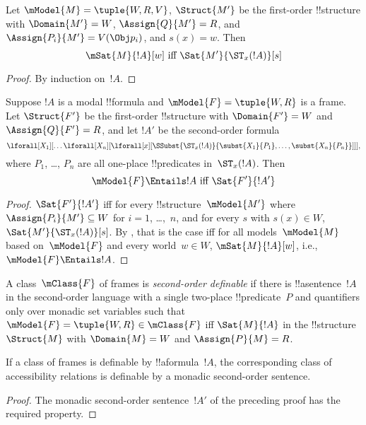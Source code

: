 \documentclass[../../../include/open-logic-section]{subfiles}
\begin{document}
\begin{prop}
  Let $\mModel{M} = \tuple{W, R, V}$, $\Struct{M'}$ be the first-order
  !!{structure} with $\Domain{M'} = W$, $\Assign{Q}{M'} = R$, and
  $\Assign{P_i}{M'} = V(\Obj p_i)$, and $s(x) = w$. Then
  \[
  \mSat{M}{!A}[w] \text{ iff } \Sat{M'}{\ST_x(!A)}[s]
  \]
\end{prop}

\begin{proof}
  By induction on~$!A$.
\end{proof}

\begin{prop}
  Suppose $!A$ is a modal !!{formula} and $\mModel{F} = \tuple{W, R}$
  is a frame. Let $\Struct{F'}$ be the first-order !!{structure} with
  $\Domain{F'} = W$ and $\Assign{Q}{F'} = R$, and let $!A'$ be the
  second-order formula
  \[
  \lforall[X_1][\dots\lforall[X_n][\lforall[x][
        \SSubst{\ST_x(!A)}{\subst{X_1}{P_1}, \dots,
          \subst{X_n}{P_n}}]]],
  \]
  where $P_1$, \dots, $P_n$ are all one-place !!{predicate}s
  in~$\ST_x(!A)$. Then
  \[
  \mModel{F} \Entails !A \text{ iff } \Sat{F'}{!A'}
  \]
\end{prop}

\begin{proof}
  $\Sat{F'}{!A'}$ iff for every !!{structure}~$\mModel{M'}$ where
  $\Assign{P_i}{M'} \subseteq W$ for $i = 1$, \dots,~$n$, and for
  every $s$ with $s(x) \in W$, $\Sat{M'}{\ST_x(!A)}[s]$. By
  , that is the case iff for all models~$\mModel{M}$
  based on~$\mModel{F}$ and every world~$w \in W$, $\mSat{M}{!A}[w]$,
  i.e., $\mModel{F} \Entails !A$.
\end{proof}

\begin{defn}
  A class~$\mClass{F}$ of frames is \emph{second-order definable} if
  there is !!a{sentence}~$!A$ in the second-order language with a
  single two-place !!{predicate}~$P$ and quantifiers only over monadic
  set variables such that $\mModel{F} = \tuple{W, R} \in \mClass{F}$
  iff $\Sat{M}{!A}$ in the !!{structure}~$\Struct{M}$ with
  $\Domain{M} = W$ and $\Assign{P}{M} = R$.
\end{defn}

\begin{cor}
  If a class of frames is definable by !!a{formula}~$!A$, the
  corresponding class of accessibility relations is definable by a
  monadic second-order sentence.
\end{cor}

\begin{proof}
  The monadic second-order sentence~$!A'$ of the preceding proof has
  the required property.
\end{proof}
\end{document}
